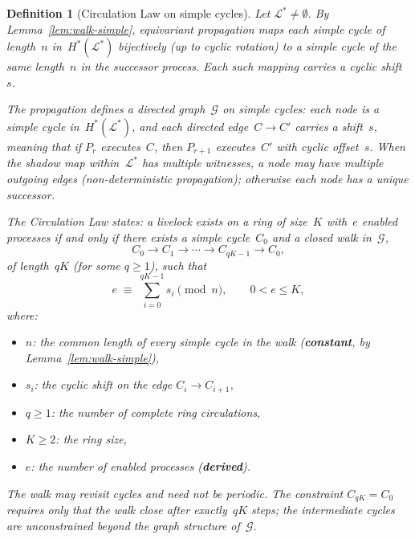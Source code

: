 \documentclass{article}
\newtheorem{definition}{Definition}
\newcommand{\Ls}{\mathcal{L}^{*}}
\newcommand{\Hstar}{H^{*}}
\begin{document}
\begin{definition}[Circulation Law on simple cycles]
\label{def:cl-simple}
Let $\Ls\neq\emptyset$.
By Lemma~\ref{lem:walk-simple}, equivariant propagation maps
each simple cycle of length~$n$ in~$\Hstar(\Ls)$ bijectively
(up to cyclic rotation) to a simple cycle of the same length~$n$
in the successor process.
Each such mapping carries a cyclic shift~$s$.

The propagation defines a directed graph~$\mathcal{G}$ on
simple cycles: each node is a simple cycle in~$\Hstar(\Ls)$, and
each directed edge~$C\to C'$ carries a shift~$s$, meaning
that if $P_r$ executes~$C$, then $P_{r+1}$ executes~$C'$
with cyclic offset~$s$.
When the shadow map within~$\Ls$ has multiple witnesses,
a node may have multiple outgoing edges (non-deterministic
propagation); otherwise each node has a unique successor.

The \emph{Circulation Law} states: a livelock exists on a ring
of size~$K$ with~$e$ enabled processes if and only if
there exists a simple cycle~$C_0$ and a
\emph{closed walk} in~$\mathcal{G}$,
\[
  C_0 \to C_1 \to \cdots \to C_{qK-1} \to C_0,
\]
of length~$qK$ (for some $q\geq 1$), such that
\[
  e \;\equiv\; \sum_{i=0}^{qK-1} s_i \pmod{n},
  \qquad 0 < e \leq K,
\]
where:
\begin{itemize}
  \item $n$: the common length of every simple cycle in the walk
        (\textbf{constant}, by Lemma~\ref{lem:walk-simple}),
  \item $s_i$: the cyclic shift on the edge $C_i\to C_{i+1}$,
  \item $q \geq 1$: the number of complete ring circulations,
  \item $K \geq 2$: the ring size,
  \item $e$: the number of enabled processes (\textbf{derived}).
\end{itemize}
The walk may revisit cycles and need not be periodic.
The constraint $C_{qK} = C_0$ requires only that the walk
close after exactly~$qK$ steps; the intermediate cycles are
unconstrained beyond the graph structure of~$\mathcal{G}$.
\end{definition}
\end{document}
